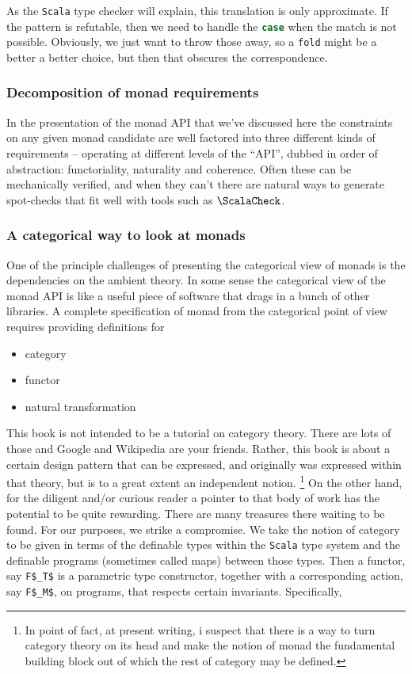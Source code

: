 As the \texttt{Scala} type checker will explain, this translation is
only approximate. If the pattern is refutable, then we need to handle
the \lstinline[language=Scala]!case! when the match is not
possible. Obviously, we just want to throw those away, so a
\lstinline[language=Scala]!fold! might be a better a better choice,
but then that obscures the correspondence.


\subsubsection{Decomposition of monad requirements}

In the presentation of the monad API that we've discussed here the
constraints on any given monad candidate are well factored into three
different kinds of requirements -- operating at different levels of
the ``API'', dubbed in order of abstraction: functoriality, naturality
and coherence. Often these can be mechanically verified, and when they
can't there are natural ways to generate spot-checks that fit well
with tools such as $\ScalaCheck$.

\subsubsection{A categorical way to look at monads}

One of the principle challenges of presenting the categorical view of
monads is the dependencies on the ambient theory. In some sense the
categorical view of the monad API is like a useful piece of software
that drags in a bunch of other libraries. A complete specification of
monad from the categorical point of view requires providing
definitions for

\begin{itemize}
  \item category
  \item functor
  \item natural transformation
\end{itemize}

This book is not intended to be a tutorial on category theory. There
are lots of those and Google and Wikipedia are your friends. Rather,
this book is about a certain design pattern that can be expressed, and
originally was expressed within that theory, but is to a great extent
an independent notion. \footnote{In point of fact, at present writing,
  i suspect that there is a way to turn category theory on its head
  and make the notion of monad the fundamental building block out of
  which the rest of category may be defined.} On the other hand, for
the diligent and/or curious reader a pointer to that body of work has
the potential to be quite rewarding. There are many treasures there
waiting to be found. For our purposes, we strike a compromise. We take
the notion of category to be given in terms of the definable types
within the \texttt{Scala} type system and the definable programs
(sometimes called maps) between those types. Then a functor, say
\lstinline[language=Scala,mathescape=true]!F$_T$! is a parametric type
constructor, together with a corresponding action, say
\lstinline[language=Scala,mathescape=true]!F$_M$!, on programs, that
respects certain invariants. Specifically,

